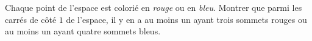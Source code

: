 Chaque point de l'espace est colorié en \emph{rouge} ou en \emph{bleu}. Montrer que parmi les carrés de côté $1$ de l'espace, il y en a au moins un ayant trois sommets rouges ou au moins un ayant quatre sommets bleus.
